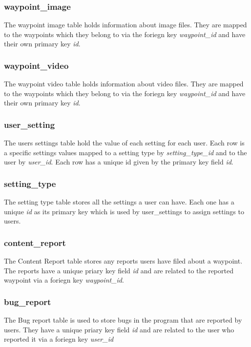 \documentclass[11pt,a4paper]{report}
\begin{document}
\subsubsection{waypoint\_image}
The waypoint image table holds information about image files. They are mapped to the waypoints which they belong to via the foriegn key \textit{waypoint\_id} and have their own primary key \textit{id}.

\subsubsection{waypoint\_video}
The waypoint video table holds information about video files. They are mapped to the waypoints which they belong to via the foriegn key \textit{waypoint\_id} and have their own primary key \textit{id}.

\subsubsection{user\_setting}
The users settings table hold the value of each setting for each user. Each row is a specific settings values mapped to a setting type by \textit{setting\_type\_id} and to the user by \textit{user\_id}. Each row has a unique id given by the primary key field \textit{id}.

\subsubsection{setting\_type}
The setting type table stores all the settings a user can have. Each one has a unique \textit{id} as its primary key which is used by user\_settings to assign settings to users.

\subsubsection{content\_report}
The Content Report table stores any reports users have filed about a waypoint. The reports have a unique priary key field \textit{id} and are related to the reported waypoint via a foriegn key \textit{waypoint\_id}. 

\subsubsection{bug\_report}
The Bug report table is used to store bugs in the program that are reported by users. They have a unique priary key field \textit{id} and are related to the user who reported it via a foriegn key \textit{user\_id}
\end{document}
